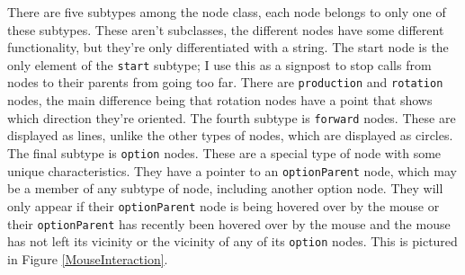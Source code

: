 \documentclass[12pt,twoside]{reedthesis}
\newcommand{\code}[1]{\texttt{#1}}
\begin{document}
	There are five subtypes among the node class, each node belongs to only one of these subtypes. These aren't subclasses, the different nodes have some different functionality, but they're only differentiated with a string. The start node is the only element of the \code{start} subtype; I use this as a signpost to stop calls from nodes to their parents from going too far. There are \code{production} and \code{rotation} nodes, the main difference being that rotation nodes have a point that shows which direction they're oriented. The fourth subtype is \code{forward} nodes. These are displayed as lines, unlike the other types of nodes, which are displayed as circles. The final subtype is \code{option} nodes. These are a special type of node with some unique characteristics. They have a pointer to an \code{optionParent} node, which may be a member of any subtype of node, including another option node. They will only appear if their \code{optionParent} node is being hovered over by the mouse or their \code{optionParent} has recently been hovered over by the mouse and the mouse has not left its vicinity or the vicinity of any of its \code{option} nodes. This is pictured in Figure \ref{MouseInteraction}.
	
\end{document}
